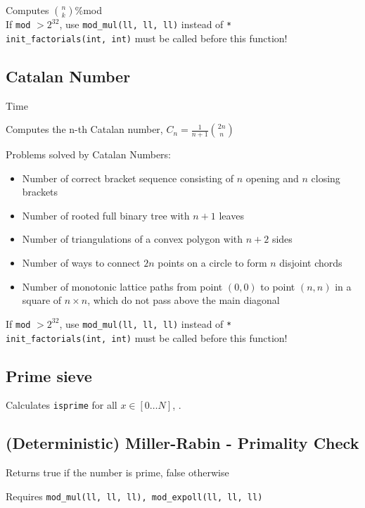 Computes $\binom{n}{k}$\:\%\:mod \\
If \verb|mod| $> 2^{32}$, use \verb|mod_mul(ll, ll, ll)| instead of \verb|*| \\
\verb|init_factorials(int, int)| must be called before this function!


\subsection{Catalan Number}
 Time

Computes the n-th Catalan number, $C_n = \frac{1}{n+1}\binom{2n}{n}$

Problems solved by Catalan Numbers:
\begin{itemize}
	\item Number of correct bracket sequence consisting of $n$ opening and $n$ closing brackets
	\item Number of rooted full binary tree with $n + 1$ leaves
	\item Number of triangulations of a convex polygon with $n + 2$ sides
	\item Number of ways to connect $2n$ points on a circle to form $n$ disjoint chords
	\item Number of monotonic lattice paths from point $(0, 0)$ to point $(n, n)$ in a square of $n \times n$, which do not pass above the main diagonal
\end{itemize}


If \verb|mod| $> 2^{32}$, use \verb|mod_mul(ll, ll, ll)| instead of \verb|*| \\
\verb|init_factorials(int, int)| must be called before this function!



\subsection{Prime sieve}
Calculates \verb|isprime| for all $x \in [0 \ldots N]$, .


\subsection{(Deterministic) Miller-Rabin - Primality Check}
Returns true if the number is prime, false otherwise

Requires \verb|mod_mul(ll, ll, ll), mod_expoll(ll, ll, ll)|



